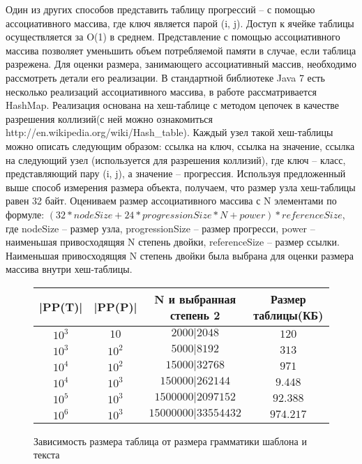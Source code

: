 \documentclass[14pt]{article}
\begin{document}
Один из других способов представить таблицу прогрессий – с помощью ассоциативного массива, где ключ является парой (i, j). Доступ к ячейке таблицы осуществляется за O(1) в среднем. Представление с помощью ассоциативного массива позволяет уменьшить объем потребляемой памяти в случае, если таблица разрежена. Для оценки размера, занимающего ассоциативный массив, необходимо рассмотреть детали его реализации. В стандартной библиотеке Java 7 есть несколько реализаций ассоциативного массива, в работе рассматривается HashMap. Реализация основана на хеш-таблице с методом цепочек в качестве разрешения коллизий(с ней можно ознакомиться http://en.wikipedia.org/wiki/Hash\_table). Каждый узел такой хеш-таблицы можно описать следующим образом: ссылка на ключ, ссылка на значение, ссылка на следующий узел (используется для разрешения коллизий), где ключ -- класс, представляющий пару (i, j), а значение -- прогрессия. Используя предложенный выше способ измерения размера объекта, получаем, что размер узла хеш-таблицы равен 32 байт. Оцениваем размер ассоциативного массива с N элементами по формуле: $(32 * nodeSize + 24 * progressionSize * N + power) * referenceSize$, где nodeSize -- размер узла, progressionSize -- размер прогресси, power -- наименьшая привосходящяя N степень двойки, referenceSize -- размер ссылки. Наименьшая привосходящяя N степень двойки была выбрана для оценки размера массива внутри хеш-таблицы.

\begin{figure}
	\begin{center}
    \begin{tabular}{ | c | c | c | c |}
        \hline |PP(T)| & |PP(P)| & N и выбранная степень 2 & Размер таблицы(КБ) \\
        \hline $10^3$ & $10$ & $2000|2048$ & $120$ \\
        \hline $10^3$ & $10^2$ & $5000|8192$ & $313$ \\
        \hline $10^4$ & $10^2$ & $15000|32768$ & $971$ \\
        \hline $10^4$ & $10^3$ & $150000|262144$ & $9.448$ \\
        \hline $10^5$ & $10^3$ & $1500000|2097152$ & $92.388$ \\
        \hline $10^6$ & $10^3$ & $15000000|33554432$ & $974.217$ \\
\hline
    \end{tabular}
    \end{center}
    \caption{Зависимость размера таблица от размера грамматики шаблона и текста}
    \label{typical_research}
\end{figure}
\end{document}
